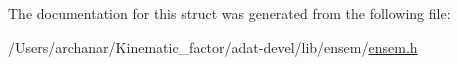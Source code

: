 The documentation for this struct was generated from the following file\+:\begin{DoxyCompactItemize}
\item 
/\+Users/archanar/\+Kinematic\+\_\+factor/adat-\/devel/lib/ensem/\mbox{\hyperlink{adat-devel_2lib_2ensem_2ensem_8h}{ensem.\+h}}\end{DoxyCompactItemize}
